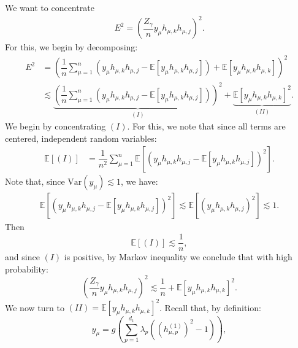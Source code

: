 \documentclass[]{article}
\makeatletter
\numberwithin{equation}{section}
\theoremstyle{definition}
\renewenvironment{proof}[1][\proofname]{\par
  \pushQED{\qed}%
  \normalfont \topsep6\p@\@plus6\p@\relax
  \trivlist
  \item[\hskip\labelsep\textbf{#1.}]\ignorespaces
}{%
  \popQED\endtrivlist\@endpefalse
}
\newcommand{\EE}{\mathbb{E}}
\makeatother
\begin{document}
\begin{proof}
    We want to concentrate
    \begin{align}
         E^{2} =\left ( \dfrac{Z_\gamma }{n} y_\mu h_{\mu,k} h_{\mu,j} \right )^{2}. 
    \end{align}
     For this, we begin by decomposing: 
    \begin{align}
        E^{2} & = \left (  \dfrac{1}{n} \sum_{\mu=1}^{n} \left ( y_\mu h_{\mu,k} h_{\mu,j} -\EE\left [y_\mu h_{\mu,k} h_{\mu,j}\right ]\right ) + \EE \left [ y_\mu h_{\mu,k}h_{\mu,k} \right ] \right )^{2} \\ 
        & \lesssim \underbrace{\left ( \dfrac{1}{n} \sum_{\mu=1}^{n} \left ( y_\mu h_{\mu,k} h_{\mu,j} -\EE\left [y_\mu h_{\mu,k} h_{\mu,j}\right ]\right )\right )^{2}}_{(I)} + \underbrace{\EE \left [ y_\mu h_{\mu,k}h_{\mu,k} \right ] ^{2}}_{(II)}. 
    \end{align}
    We begin by concentrating $(I)$. For this, we note that since all terms are centered, independent random variables: 
    \begin{align}
        \EE \left [ (I) \right ] & = \dfrac{1}{n^{2}} \sum_{\mu =1 }^{n}  \EE \left [ \left ( y_\mu h_{\mu,k} h_{\mu,j} -\EE\left [y_\mu h_{\mu,k} h_{\mu,j}\right ]\right )^{2}\right ].
    \end{align}
    Note that, since $\mathrm{Var}(y_\mu) \lesssim 1$, we have: 
    \begin{align}
        \EE \left [ \left ( y_\mu h_{\mu,k} h_{\mu,j} -\EE\left [y_\mu h_{\mu,k} h_{\mu,j}\right ]\right )^{2}\right ] \lesssim \EE \left [ \left ( y_\mu h_{\mu,k} h_{\mu,j} \right )^{2} \right ] \lesssim 1. 
    \end{align}
    Then
    \begin{equation}
        \EE \left [ (I) \right ] \lesssim \dfrac{1}{n},
    \end{equation}
    and since $(I)$ is positive, by Markov inequality we conclude that with high probability: 
    \begin{equation}
        \left ( \dfrac{Z_\gamma }{n} y_\mu h_{\mu,k} h_{\mu,j} \right )^{2} \lesssim \dfrac{1}{n}  + \EE \left [ y_\mu h_{\mu,k}h_{\mu,k} \right ] ^{2}. 
        \label{eq:bound_I_sum_y}
    \end{equation}
    We now turn to $(II)= \EE \left [ y_\mu h_{\mu,k}h_{\mu,k} \right ] ^{2}$. Recall that, by definition: 
    \begin{equation}
        y_\mu = g\left ( \sum_{p=1}^{d_1}  \lambda_p ((h^{(1)}_{\mu, p})^{2} - 1) \right ),
    \end{equation}

\end{proof}
\end{document}

